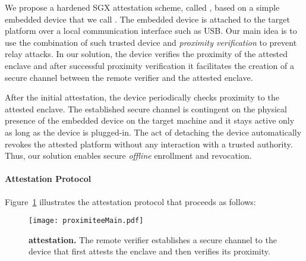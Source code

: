 We propose a hardened SGX attestation scheme, called \namepm, based on a simple embedded device that we call \device. The embedded device is attached to the target platform over a local communication interface such as USB. 
Our main idea is to use the combination of such trusted device and \emph{proximity verification} to prevent relay attacks. In our solution, the \devicepm device verifies the proximity of the attested enclave and after successful proximity verification it facilitates the creation of a secure channel between the remote verifier and the attested enclave. 

After the initial attestation, the device periodically checks proximity to the attested enclave. The established secure channel is contingent on the physical presence of the embedded device on the target machine and it stays active only as long as the device is plugged-in. The act of detaching the device automatically revokes the attested platform without any interaction with a trusted authority. Thus, our solution enables secure \emph{offline} enrollment and revocation. 


\paragraph{Attestation Protocol} Figure~\ref{fig:systemSetUp} illustrates the \namepm attestation protocol that proceeds as follows:


\begin{figure}[t]
 \centering
  \texttt{[image: proximiteeMain.pdf]}
 \caption{\textbf{\namepm attestation.} The remote verifier establishes a secure channel to the \devicepm device that first attests the enclave and then verifies its proximity.}
 \label{fig:systemSetUp}
\end{figure}

